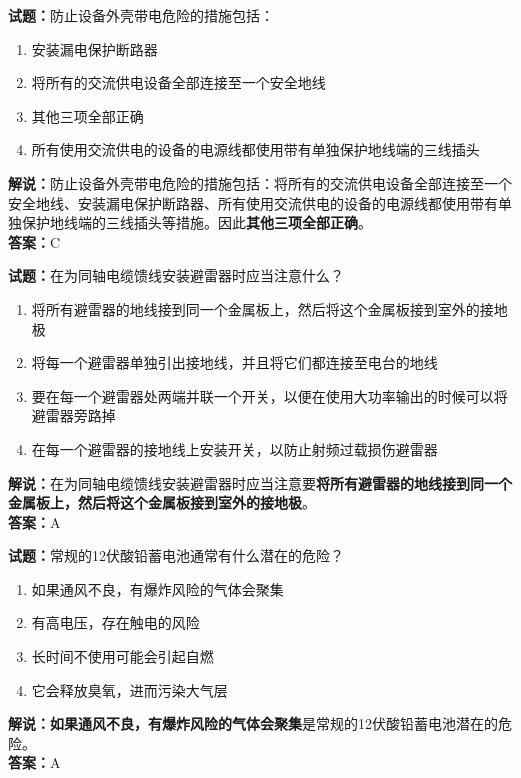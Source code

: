 \documentclass{ctexbook}
\begin{document}
\textbf{试题：}防止设备外壳带电危险的措施包括：
\begin{enumerate}[leftmargin=3em]
  \item 安装漏电保护断路器
  \item 将所有的交流供电设备全部连接至一个安全地线
  \item 其他三项全部正确
  \item 所有使用交流供电的设备的电源线都使用带有单独保护地线端的三线插头
\end{enumerate}
\noindent\textbf{解说：}防止设备外壳带电危险的措施包括：将所有的交流供电设备全部连接至一个安全地线、安装漏电保护断路器、所有使用交流供电的设备的电源线都使用带有单独保护地线端的三线插头等措施。因此\textbf{其他三项全部正确}。\\\noindent\textbf{答案：}C

\vspace{1em}

\textbf{试题：}在为同轴电缆馈线安装避雷器时应当注意什么？
\begin{enumerate}[leftmargin=3em]
  \item 将所有避雷器的地线接到同一个金属板上，然后将这个金属板接到室外的接地极
  \item 将每一个避雷器单独引出接地线，并且将它们都连接至电台的地线
  \item 要在每一个避雷器处两端并联一个开关，以便在使用大功率输出的时候可以将避雷器旁路掉
  \item 在每一个避雷器的接地线上安装开关，以防止射频过载损伤避雷器
\end{enumerate}
\noindent\textbf{解说：}在为同轴电缆馈线安装避雷器时应当注意要\textbf{将所有避雷器的地线接到同一个金属板上，然后将这个金属板接到室外的接地极}。\\\noindent\textbf{答案：}A

\vspace{1em}

\textbf{试题：}常规的12伏酸铅蓄电池通常有什么潜在的危险？
\begin{enumerate}[leftmargin=3em]
  \item 如果通风不良，有爆炸风险的气体会聚集
  \item 有高电压，存在触电的风险
  \item 长时间不使用可能会引起自燃
  \item 它会释放臭氧，进而污染大气层
\end{enumerate}
\noindent\textbf{解说：}\textbf{如果通风不良，有爆炸风险的气体会聚集}是常规的12伏酸铅蓄电池潜在的危险。\\\noindent\textbf{答案：}A
\end{document}
